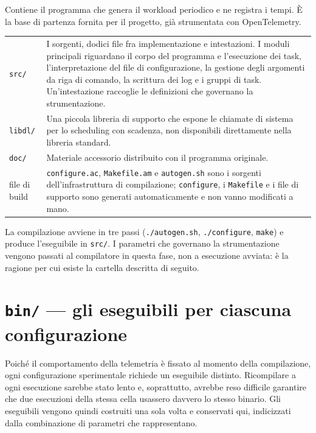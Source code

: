 \documentclass[11pt,a4paper]{article}
\begin{document}
Contiene il programma che genera il workload periodico e ne registra i tempi. \`E la base di
partenza fornita per il progetto, gi\`a strumentata con OpenTelemetry.

\begin{center}\small
\begin{tabular}{p{3.4cm}p{10.9cm}}
\toprule
\texttt{src/} & I sorgenti, dodici file fra implementazione e intestazioni. I moduli principali
riguardano il corpo del programma e l'esecuzione dei task, l'interpretazione del file di
configurazione, la gestione degli argomenti da riga di comando, la scrittura dei log e i gruppi di
task. Un'intestazione raccoglie le definizioni che governano la strumentazione. \\
\addlinespace
\texttt{libdl/} & Una piccola libreria di supporto che espone le chiamate di sistema per lo
scheduling con scadenza, non disponibili direttamente nella libreria standard. \\
\addlinespace
\texttt{doc/} & Materiale accessorio distribuito con il programma originale. \\
\addlinespace
file di build & \texttt{configure.ac}, \texttt{Makefile.am} e \texttt{autogen.sh} sono i sorgenti
dell'infrastruttura di compilazione; \texttt{configure}, i \texttt{Makefile} e i file di supporto
sono generati automaticamente e non vanno modificati a mano. \\
\bottomrule
\end{tabular}
\end{center}

La compilazione avviene in tre passi (\texttt{./autogen.sh}, \texttt{./configure},
\texttt{make}) e produce l'eseguibile in \texttt{src/}. I parametri che governano la strumentazione
vengono passati al compilatore in questa fase, non a esecuzione avviata: \`e la ragione per cui
esiste la cartella descritta di seguito.

\section{\texttt{bin/} --- gli eseguibili per ciascuna configurazione}

Poich\'e il comportamento della telemetria \`e fissato al momento della compilazione, ogni
configurazione sperimentale richiede un eseguibile distinto. Ricompilare a ogni esecuzione
sarebbe stato lento e, soprattutto, avrebbe reso difficile garantire che due esecuzioni della stessa
cella usassero davvero lo stesso binario. Gli eseguibili vengono quindi costruiti una sola volta e
conservati qui, indicizzati dalla combinazione di parametri che rappresentano.
\end{document}
